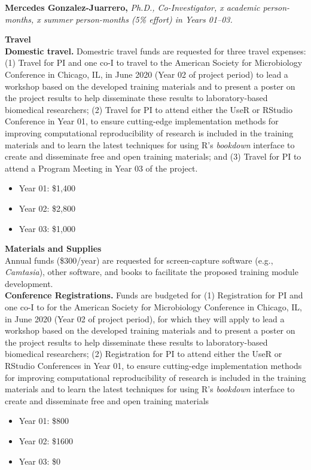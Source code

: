\documentclass[pdftex,english,11pt,parskip=half]{scrartcl}
\begin{document}
\noindent \textbf{Mercedes Gonzalez-Juarrero,} \textit{Ph.D., Co-Investigator, x academic person-months, x summer person-months (5\% effort) in Years 01--03.}

{\large \textbf{Travel}} \\

\noindent \textbf{Domestic travel.} Domestric travel funds are requested for three travel expenses: (1) Travel for PI and one co-I to travel to the American Society for Microbiology Conference in Chicago, IL, in June 2020 (Year 02 of project period) to lead a workshop based on the developed training materials and to present a poster on the project results to help disseminate these results to laboratory-based biomedical researchers; (2) Travel for PI to attend either the UseR or RStudio Conference in Year 01, to ensure cutting-edge implementation methods for improving computational reproducibility of research is included in the training materials and to learn the latest techniques for using R's \textit{bookdown} interface to create and disseminate free and open training materials; and (3) Travel for PI to attend a Program Meeting in Year 03 of the project. 
\begin{itemize}
\item Year 01: \$1,400
\item Year 02: \$2,800
\item Year 03: \$1,000
\end{itemize}

{\large \textbf{Materials and Supplies}} \\ Annual funds (\$300/year) are requested for screen-capture software (e.g., \textit{Camtasia}), other software, and books to facilitate the proposed training module development. \\

\noindent \textbf{Conference Registrations.} Funds are budgeted for (1) Registration for PI and one co-I to for the American Society for Microbiology Conference in Chicago, IL, in June 2020 (Year 02 of project period), for which they will apply to lead a workshop based on the developed training materials and to present a poster on the project results to help disseminate these results to laboratory-based biomedical researchers; (2) Registration for PI to attend either the UseR or RStudio Conferences in Year 01, to ensure cutting-edge implementation methods for improving computational reproducibility of research is included in the training materials and to learn the latest techniques for using R's \textit{bookdown} interface to create and disseminate free and open training materials
\begin{itemize}
\item Year 01: \$800
\item Year 02: \$1600
\item Year 03: \$0
\end{itemize}
\end{document}
